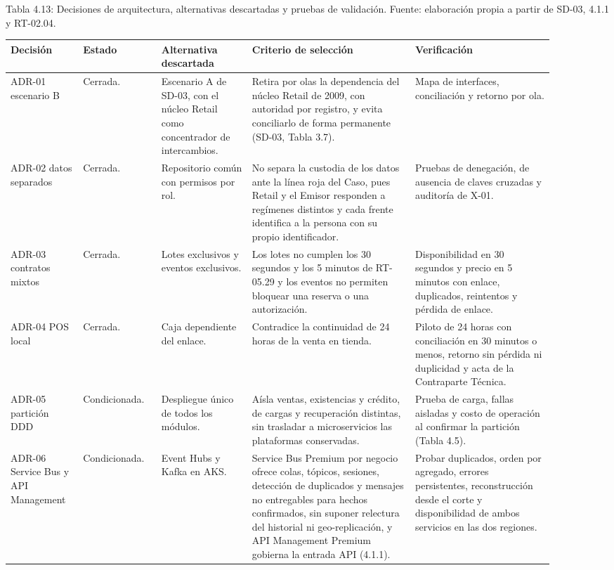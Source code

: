 \documentclass[11pt]{article}
\begin{document}
Tabla 4.13: Decisiones de arquitectura, alternativas descartadas y pruebas de validación. Fuente: elaboración propia a partir de SD-03, 4.1.1 y RT-02.04.\par\nopagebreak
\begin{longtable}{@{}p{0.125\linewidth}p{0.12\linewidth}p{0.15\linewidth}p{0.27\linewidth}p{0.23\linewidth}@{}}
\toprule Decisión & Estado & Alternativa descartada & Criterio de selección & Verificación \\
\midrule\endhead\bottomrule\endlastfoot
ADR-01 escenario B & Cerrada. & Escenario A de SD-03, con el núcleo Retail como concentrador de intercambios. & Retira por olas la dependencia del núcleo Retail de 2009, con autoridad por registro, y evita conciliarlo de forma permanente (SD-03, Tabla 3.7). & Mapa de interfaces, conciliación y retorno por ola. \\
ADR-02 datos separados & Cerrada. & Repositorio común con permisos por rol. & No separa la custodia de los datos ante la línea roja del Caso, pues Retail y el Emisor responden a regímenes distintos y cada frente identifica a la persona con su propio identificador. & Pruebas de denegación, de ausencia de claves cruzadas y auditoría de X-01. \\
ADR-03 contratos mixtos & Cerrada. & Lotes exclusivos y eventos exclusivos. & Los lotes no cumplen los 30 segundos y los 5 minutos de RT-05.29 y los eventos no permiten bloquear una reserva o una autorización. & Disponibilidad en 30 segundos y precio en 5 minutos con enlace, duplicados, reintentos y pérdida de enlace. \\
ADR-04 POS local & Cerrada. & Caja dependiente del enlace. & Contradice la continuidad de 24 horas de la venta en tienda. & Piloto de 24 horas con conciliación en 30 minutos o menos, retorno sin pérdida ni duplicidad y acta de la Contraparte Técnica. \\
ADR-05 partición DDD & Condicionada. & Despliegue único de todos los módulos. & Aísla ventas, existencias y crédito, de cargas y recuperación distintas, sin trasladar a microservicios las plataformas conservadas. & Prueba de carga, fallas aisladas y costo de operación al confirmar la partición (Tabla 4.5). \\
ADR-06 Service Bus y API Management & Condicionada. & Event Hubs y Kafka en AKS. & Service Bus Premium por negocio ofrece colas, tópicos, sesiones, detección de duplicados y mensajes no entregables para hechos confirmados, sin suponer relectura del historial ni geo-replicación, y API Management Premium gobierna la entrada API (4.1.1). & Probar duplicados, orden por agregado, errores persistentes, reconstrucción desde el corte y disponibilidad de ambos servicios en las dos regiones. \\

\end{longtable}
\end{document}
